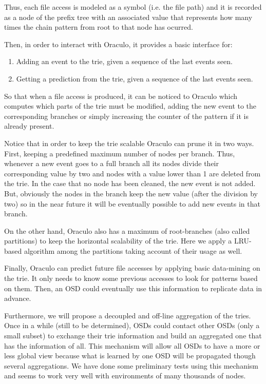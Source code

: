 Thus, each file access is modeled as a symbol (i.e. the file path) and it is
recorded as a node of the prefix tree with an associated value that represents
how many times the chain pattern from root to that node has ocurred.

Then, in order to interact with Oraculo, it provides a basic interface for:
\begin{enumerate}
 \item Adding an event to the trie, given a sequence of the last events seen.
 \item Getting a prediction from the trie, given a sequence of the last events
seen.
\end{enumerate}

So that when a file access is produced, it can be noticed to Oraculo which
computes which parts of the trie must be modified, adding the new event to the
corresponding branches or simply increasing the counter of the pattern if it is
already present.

Notice that in order to keep the trie scalable Oraculo can prune it in two ways.
First, keeping a predefined maximum number of nodes per branch. Thus, whenever a
new event goes to a full branch all its nodes divide their corresponding value
by two and nodes with a value lower than 1 are deleted from the trie. In the
case that no node has been cleaned, the new event is not added. But, obviously
the nodes in the branch keep the new value (after the division by two) so in the
near future it will be eventually possible to add new events in that branch.

On the other hand, Oraculo also has a maximum of root-branches (also called
partitions) to keep the horizontal scalability of the trie. Here we apply a
LRU-based algorithm among the partitions taking account of their usage as well.

Finally, Oraculo can predict future file accesses by applying basic data-mining
on the trie. It only needs to know some previous accesses to look for patterns
based on them. Then, an OSD could eventually use this information to replicate
data in advance.

Furthermore, we will propose a decoupled and off-line aggregation of the tries.
Once in a while (still to be determined), OSDs could contact other OSDs (only a
small subset) to exchange their trie information and build an aggregated one
that has the information of all. This mechanism will allow all OSDs to have a
more or less global view because what is learned by one OSD will be propagated
though several aggregations. We have done some preliminary tests using this
mechanism and seems to work very well with environments of many thousands of
nodes.


